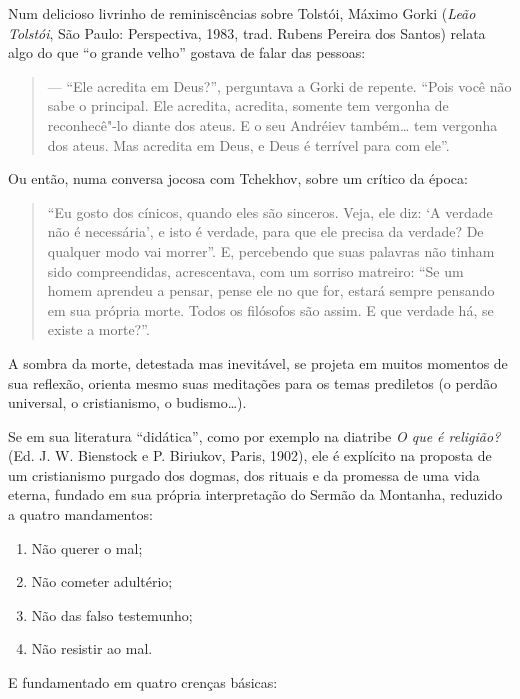 Num delicioso livrinho de reminiscências sobre Tolstói,
Máximo Gorki (\emph{Leão Tolstói}, São Paulo:
Perspectiva, 1983, trad. Rubens Pereira dos Santos) relata algo do que ``o grande velho'' gostava de falar das
pessoas:

\begin{quote}
--- ``Ele acredita em Deus?'', perguntava a Gorki de repente.
``Pois você não sabe o principal. Ele acredita, acredita, somente tem
vergonha de reconhecê"-lo diante dos ateus. E o seu Andréiev também\ldots{} tem vergonha dos ateus. Mas acredita em Deus, e Deus é terrível para com
ele''.
\end{quote}

Ou então, numa conversa jocosa com Tchekhov, sobre um crítico da época:

\begin{quote}
``Eu gosto dos cínicos, quando eles são sinceros. Veja, ele diz: `A
verdade não é necessária', e isto é verdade, para que ele precisa da
verdade? De qualquer modo vai morrer''. E, percebendo que suas palavras
não tinham sido compreendidas, acrescentava, com um sorriso matreiro:
``Se um homem aprendeu a pensar, pense ele no que for, estará sempre
pensando em sua própria morte. Todos os filósofos são assim. E que
verdade há, se existe a morte?''.
\end{quote}

A sombra da morte, detestada mas inevitável, se projeta em muitos
momentos de sua reflexão, orienta mesmo suas meditações para os temas
prediletos (o perdão universal, o cristianismo, o budismo\ldots{}).

Se em sua literatura ``didática'', como por exemplo na diatribe \emph{O que é
religião?} (Ed. J. W. Bienstock e P. Biriukov, Paris, 1902), ele é
explícito na proposta de um cristianismo purgado dos dogmas, dos rituais
e da promessa de uma vida eterna, fundado em sua própria interpretação
do Sermão da Montanha, reduzido a quatro mandamentos:

\begin{enumerate}
\def\labelenumi{\arabic{enumi})}
\item
  Não querer o mal;
\item
  Não cometer adultério;
\item
  Não das falso testemunho;
\item
  Não resistir ao mal.
\end{enumerate}

\noindent
E fundamentado em quatro crenças básicas:

